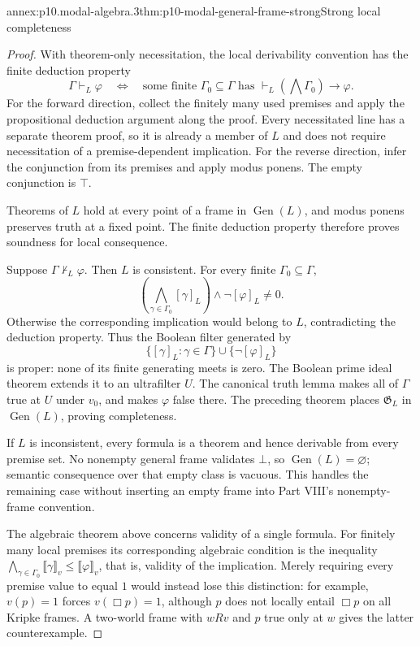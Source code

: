 \begin{annexitem}{annex:p10.modal-algebra.3}{thm:p10-modal-general-frame-strong}{Strong local completeness}
\begin{proof}
With theorem-only necessitation, the local derivability convention
has the finite deduction property
\[
 \Gamma\vdash_L\varphi
 \quad\Longleftrightarrow\quad
 \text{some finite }\Gamma_0\subseteq\Gamma
 \text{ has }\vdash_L(\bigwedge\Gamma_0)\to\varphi.
\]
For the forward direction, collect the finitely many used premises
and apply the propositional deduction argument along the proof.
Every necessitated line has a separate theorem proof, so it is
already a member of \(L\) and does not require necessitation
of a premise-dependent implication.
For the reverse direction, infer the conjunction from its
premises and apply modus ponens.  The empty conjunction is \(\top\).

Theorems of \(L\) hold at every point of a frame in
\(\operatorname{Gen}(L)\), and modus ponens preserves truth
at a fixed point.  The finite deduction property therefore
proves soundness for local consequence.

Suppose \(\Gamma\not\vdash_L\varphi\).
Then \(L\) is consistent.
For every finite \(\Gamma_0\subseteq\Gamma\),
\[
 \left(\bigwedge_{\gamma\in\Gamma_0}[\gamma]_L\right)
                    \wedge\neg[\varphi]_L\ne0.
\]
Otherwise the corresponding implication would belong to \(L\),
contradicting the deduction property.
Thus the Boolean filter generated by
\[
 \{[\gamma]_L:\gamma\in\Gamma\}
                 \cup\{\neg[\varphi]_L\}
\]
is proper: none of its finite generating meets is zero.
The Boolean prime ideal theorem extends it to an ultrafilter \(U\).
The canonical truth lemma makes all of \(\Gamma\) true at \(U\)
under \(v_0\), and makes \(\varphi\) false there.
The preceding theorem places \(\mathfrak G_L\) in
\(\operatorname{Gen}(L)\), proving completeness.

If \(L\) is inconsistent, every formula is a theorem and hence
derivable from every premise set.
No nonempty general frame validates \(\bot\), so
\(\operatorname{Gen}(L)=\varnothing\); semantic consequence
over that empty class is vacuous.
This handles the remaining case without inserting an empty
frame into Part VIII's nonempty-frame convention.

The algebraic theorem above concerns validity of a single formula.
For finitely many local premises its corresponding algebraic
condition is the inequality
\(\bigwedge_{\gamma\in\Gamma_0}\llbracket\gamma\rrbracket_v
\leq\llbracket\varphi\rrbracket_v\), that is, validity of the
implication.  Merely requiring every premise value to equal
\(1\) would instead lose this distinction: for example,
\(v(p)=1\) forces \(v(\Box p)=1\), although \(p\) does not
locally entail \(\Box p\) on all Kripke frames.
A two-world frame with \(wRv\) and \(p\) true only at \(w\)
gives the latter counterexample.
\end{proof}
\end{annexitem}

